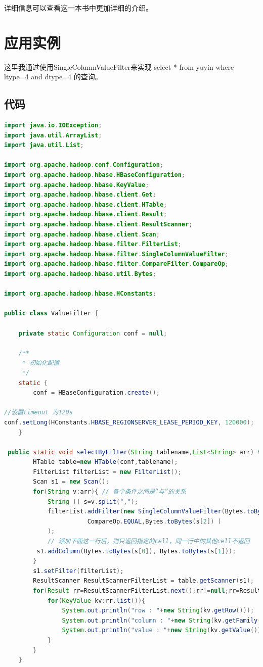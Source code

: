 详细信息可以查看\cite{HBaseGuide}这一本书中更加详细的介绍。

\section{应用实例}
这里我通过使用SingleColumnValueFilter来实现 select * from yuyin where ltype=4 and dtype=4 的查询。

\subsection{代码}

\begin{lstlisting}[language=Java]
import java.io.IOException;
import java.util.ArrayList;
import java.util.List;

import org.apache.hadoop.conf.Configuration;
import org.apache.hadoop.hbase.HBaseConfiguration;
import org.apache.hadoop.hbase.KeyValue;
import org.apache.hadoop.hbase.client.Get;
import org.apache.hadoop.hbase.client.HTable;
import org.apache.hadoop.hbase.client.Result;
import org.apache.hadoop.hbase.client.ResultScanner;
import org.apache.hadoop.hbase.client.Scan;
import org.apache.hadoop.hbase.filter.FilterList;
import org.apache.hadoop.hbase.filter.SingleColumnValueFilter;
import org.apache.hadoop.hbase.filter.CompareFilter.CompareOp;
import org.apache.hadoop.hbase.util.Bytes;

import org.apache.hadoop.hbase.HConstants;

public class ValueFilter {

    private static Configuration conf = null;

    /** 
     * 初始化配置 
     */
    static {
        conf = HBaseConfiguration.create();

//设置timeout 为120s
conf.setLong(HConstants.HBASE_REGIONSERVER_LEASE_PERIOD_KEY, 120000);
    } 
     
 public static void selectByFilter(String tablename,List<String> arr) throws IOException{   
        HTable table=new HTable(conf,tablename);   
        FilterList filterList = new FilterList();
        Scan s1 = new Scan();
        for(String v:arr){ // 各个条件之间是“与”的关系   
            String [] s=v.split(",");
            filterList.addFilter(new SingleColumnValueFilter(Bytes.toBytes(s[0]),Bytes.toBytes(s[1]),
                       CompareOp.EQUAL,Bytes.toBytes(s[2]) )
            );
            // 添加下面这一行后，则只返回指定的cell，同一行中的其他cell不返回   
         s1.addColumn(Bytes.toBytes(s[0]), Bytes.toBytes(s[1]));   
        }
        s1.setFilter(filterList);
        ResultScanner ResultScannerFilterList = table.getScanner(s1);
        for(Result rr=ResultScannerFilterList.next();rr!=null;rr=ResultScannerFilterList.next()){
            for(KeyValue kv:rr.list()){
                System.out.println("row : "+new String(kv.getRow()));
                System.out.println("column : "+new String(kv.getFamily()));
                System.out.println("value : "+new String(kv.getValue()));
            }
        }
    }


\end{lstlisting}
